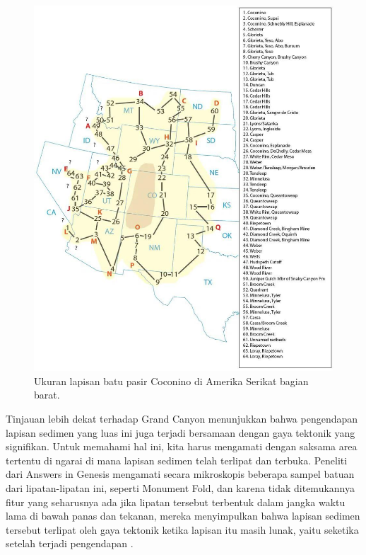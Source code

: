 \documentclass[10pt,twocolumn,letterpaper]{article}
\begin{document}
\begin{figure}[t]
\begin{center}
   \includegraphics[width=1\linewidth]{coconino.jpg}
\end{center}
   \caption{Ukuran lapisan batu pasir Coconino di Amerika Serikat bagian barat\cite{21}.}
\label{fig:3}
\label{fig:onecol}
\end{figure}

Tinjauan lebih dekat terhadap Grand Canyon menunjukkan bahwa pengendapan lapisan sedimen yang luas ini juga terjadi bersamaan dengan gaya tektonik yang signifikan. Untuk memahami hal ini, kita harus mengamati dengan saksama area tertentu di ngarai di mana lapisan sedimen telah terlipat dan terbuka. Peneliti dari Answers in Genesis \cite{42} mengamati secara mikroskopis beberapa sampel batuan dari lipatan-lipatan ini, seperti Monument Fold, dan karena tidak ditemukannya fitur yang seharusnya ada jika lipatan tersebut terbentuk dalam jangka waktu lama di bawah panas dan tekanan, mereka menyimpulkan bahwa lapisan sedimen tersebut terlipat oleh gaya tektonik ketika lapisan itu masih lunak, yaitu seketika setelah terjadi pengendapan \cite{43}.
\end{document}
